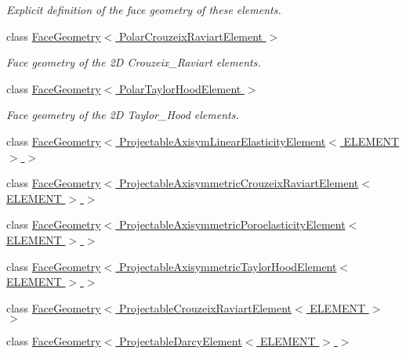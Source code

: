 \begin{DoxyCompactItemize}
\begin{DoxyCompactList}\small\item\em Explicit definition of the face geometry of these elements. \end{DoxyCompactList}\item 
class \hyperlink{classoomph_1_1FaceGeometry_3_01PolarCrouzeixRaviartElement_01_4}{Face\+Geometry$<$ Polar\+Crouzeix\+Raviart\+Element $>$}
\begin{DoxyCompactList}\small\item\em Face geometry of the 2D Crouzeix\+\_\+\+Raviart elements. \end{DoxyCompactList}\item 
class \hyperlink{classoomph_1_1FaceGeometry_3_01PolarTaylorHoodElement_01_4}{Face\+Geometry$<$ Polar\+Taylor\+Hood\+Element $>$}
\begin{DoxyCompactList}\small\item\em Face geometry of the 2D Taylor\+\_\+\+Hood elements. \end{DoxyCompactList}\item 
class \hyperlink{classoomph_1_1FaceGeometry_3_01ProjectableAxisymLinearElasticityElement_3_01ELEMENT_01_4_01_4}{Face\+Geometry$<$ Projectable\+Axisym\+Linear\+Elasticity\+Element$<$ E\+L\+E\+M\+E\+N\+T $>$ $>$}
\item 
class \hyperlink{classoomph_1_1FaceGeometry_3_01ProjectableAxisymmetricCrouzeixRaviartElement_3_01ELEMENT_01_4_01_4}{Face\+Geometry$<$ Projectable\+Axisymmetric\+Crouzeix\+Raviart\+Element$<$ E\+L\+E\+M\+E\+N\+T $>$ $>$}
\item 
class \hyperlink{classoomph_1_1FaceGeometry_3_01ProjectableAxisymmetricPoroelasticityElement_3_01ELEMENT_01_4_01_4}{Face\+Geometry$<$ Projectable\+Axisymmetric\+Poroelasticity\+Element$<$ E\+L\+E\+M\+E\+N\+T $>$ $>$}
\item 
class \hyperlink{classoomph_1_1FaceGeometry_3_01ProjectableAxisymmetricTaylorHoodElement_3_01ELEMENT_01_4_01_4}{Face\+Geometry$<$ Projectable\+Axisymmetric\+Taylor\+Hood\+Element$<$ E\+L\+E\+M\+E\+N\+T $>$ $>$}
\item 
class \hyperlink{classoomph_1_1FaceGeometry_3_01ProjectableCrouzeixRaviartElement_3_01ELEMENT_01_4_01_4}{Face\+Geometry$<$ Projectable\+Crouzeix\+Raviart\+Element$<$ E\+L\+E\+M\+E\+N\+T $>$ $>$}
\item 
class \hyperlink{classoomph_1_1FaceGeometry_3_01ProjectableDarcyElement_3_01ELEMENT_01_4_01_4}{Face\+Geometry$<$ Projectable\+Darcy\+Element$<$ E\+L\+E\+M\+E\+N\+T $>$ $>$}
\item 

\end{DoxyCompactItemize}
